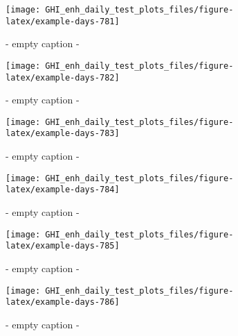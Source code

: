 \documentclass[
  10pt,
  a4paper,oneside]{article}
\begin{document}
\begin{figure}[H]

{\centering \texttt{[image: GHI\_enh\_daily\_test\_plots\_files/figure-latex/example-days-781]} 

}

\caption{ - empty caption - }\label{fig:example-days-781}
\end{figure}

\begin{figure}[H]

{\centering \texttt{[image: GHI\_enh\_daily\_test\_plots\_files/figure-latex/example-days-782]} 

}

\caption{ - empty caption - }\label{fig:example-days-782}
\end{figure}

\begin{figure}[H]

{\centering \texttt{[image: GHI\_enh\_daily\_test\_plots\_files/figure-latex/example-days-783]} 

}

\caption{ - empty caption - }\label{fig:example-days-783}
\end{figure}

\begin{figure}[H]

{\centering \texttt{[image: GHI\_enh\_daily\_test\_plots\_files/figure-latex/example-days-784]} 

}

\caption{ - empty caption - }\label{fig:example-days-784}
\end{figure}

\begin{figure}[H]

{\centering \texttt{[image: GHI\_enh\_daily\_test\_plots\_files/figure-latex/example-days-785]} 

}

\caption{ - empty caption - }\label{fig:example-days-785}
\end{figure}

\begin{figure}[H]

{\centering \texttt{[image: GHI\_enh\_daily\_test\_plots\_files/figure-latex/example-days-786]} 

}

\caption{ - empty caption - }\label{fig:example-days-786}
\end{figure}
\end{document}
